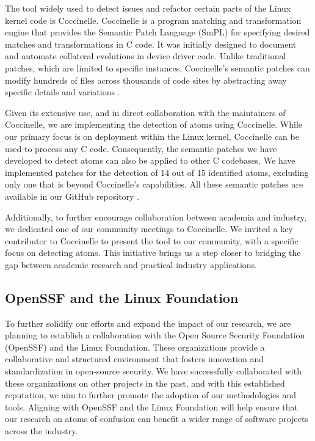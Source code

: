 \documentclass[conference]{IEEEtran}
\begin{document}
The tool widely used to detect issues and refactor certain 
parts of the Linux kernel code is Coccinelle. Coccinelle is a 
program matching and transformation engine that provides the 
Semantic Patch Language (SmPL) for specifying desired matches 
and transformations in C code. It was initially designed to 
document and automate collateral evolutions in device driver 
code. Unlike traditional patches, which are limited to 
specific instances, Coccinelle's semantic patches can modify 
hundreds of files across thousands of code sites by 
abstracting away specific details and variations \cite{coccinelle}.

Given its extensive use, and in direct collaboration with the 
maintainers of Coccinelle, we are implementing the detection 
of atoms using Coccinelle. While our primary focus is on 
deployment within the Linux kernel, Coccinelle can be used to 
process any C code. Consequently, the semantic patches we have 
developed to detect atoms can also be applied to other C 
codebases. We have implemented patches for the detection of 14 
out of 15 identified atoms, excluding only one that is beyond 
Coccinelle's capabilities. All these semantic patches are available in our GitHub repository \cite{githubcocci}. 

Additionally, to further encourage collaboration between 
academia and industry, we dedicated one of our community 
meetings to Coccinelle. We invited a key contributor to 
Coccinelle to present the tool to our community, with a 
specific focus on detecting atoms. This initiative brings us a 
step closer to bridging the gap between academic research and 
practical industry applications.

\subsection{OpenSSF and the Linux Foundation}

To further solidify our efforts and expand the impact of our 
research, we are planning to establish a collaboration with 
the Open Source Security Foundation (OpenSSF) and the Linux 
Foundation. These organizations provide a collaborative and 
structured environment that fosters innovation and 
standardization in open-source security. We have successfully 
collaborated with these organizations on other projects in the 
past, and with this established reputation, we aim to further 
promote the adoption of our methodologies and tools. Aligning 
with OpenSSF and the Linux Foundation will help ensure that 
our research on atoms of confusion can benefit a wider range 
of software projects across the industry.


{\scriptsize  }
\end{document}
